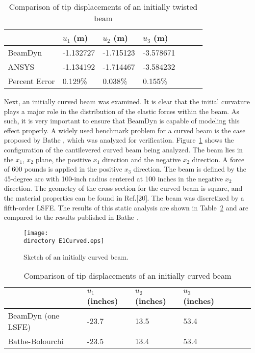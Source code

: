 \documentclass{aiaa-tc}
\def\directory{EPSF/}
\begin{document}
\begin{table}
\caption{\label{E1u} Comparison of tip displacements of an initially twisted beam} 
\begin{center} 
    \begin{tabular}{| l | l | l | l | l | l | l |}
    	\hline
    	        & $u_1$ (m) & $u_2$ (m) & $u_3$ (m)  \\ \hline
    	BeamDyn  & -1.132727     & -1.715123       & -3.578671      \\  \hline
    	ANSYS   & -1.134192     & -1.714467      & -3.584232     \\ \hline
    	Percent Error   & 0.129\%     & 0.038\%      & 0.155\%     \\ \hline
    \end{tabular}
\end{center}
\end{table} 

Next, an initially curved beam was examined. It is clear that the initial curvature plays a major role in the distribution of the elastic forces within the beam. As such, it is very important to ensure that BeamDyn is capable of modeling this effect properly. A widely used benchmark problem for a curved beam is the case proposed by Bathe \cite{Bathe1979}, which was analyzed for verification. Figure~\ref{E1Curved} shows the configuration of the cantilevered curved beam being analyzed. The beam lies in the $x_1$, $x_2$ plane, the positive $x_1$ direction and the negative $x_2$ direction. A force of 600 pounds is applied in the positive $x_3$ direction. The beam is defined by the 45-degree arc with 100-inch radius centered at 100 inches in the negative $x_2$ direction.  The geometry of the cross section for the curved beam is square, and the material properties can be found in Ref.[20].  The beam was discretized by a fifth-order LSFE. The results of this static analysis are shown in Table~\ref{E1CurvedDisp} and are compared to the results published in Bathe \cite{Bathe1979}.

\begin{figure}
\centering
\texttt{[image: \\directory E1Curved.eps]}
\caption{Sketch of an initially curved beam.} 
\label{E1Curved}
\end{figure}

\begin{table}
\caption{\label{E1CurvedDisp} Comparison of tip displacements of an initially curved beam } 
\begin{center}
    \begin{tabular}{| l | l | l | l | l | l | l |}
    	\hline
    	        & $u_1$ (inches) & $u_2$ (inches) & $u_3$ (inches)  \\ \hline
    	BeamDyn (one LSFE) & -23.7     & 13.5       & 53.4      \\  \hline
    	Bathe-Bolourchi \cite{Bathe1979}   & -23.5     & 13.4       & 53.4     \\ \hline
    \end{tabular}
\end{center}
\end{table} 
\end{document}
